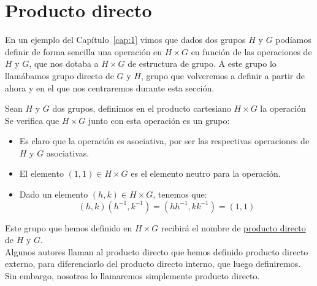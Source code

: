 \section{Producto directo}
En un ejemplo del Capítulo~\ref{cap:1} vimos que dados dos grupos $H$ y $G$ podíamos definir de forma sencilla una operación en $H\times G$ en función de las operaciones de $H$ y $G$, que nos dotaba a $H\times G$ de estructura de grupo. A este grupo lo llamábamos grupo directo de $G$ y $H$, grupo que volveremos a definir a partir de ahora y en el que nos centraremos durante esta sección.

\begin{definicion}
    Sean $H$ y $G$ dos grupos, definimos en el producto cartesiano $H\times G$ la operación
    Se verifica que $H\times G$ junto con esta operación es un grupo:
    \begin{itemize}
        \item Es claro que la operación es asociativa, por ser las respectivas operaciones de $H$ y $G$ asociativas.
        \item El elemento $(1,1)\in H\times G$ es el elemento neutro para la operación.
        \item Dado un elemento $(h,k)\in H\times G$, tenemos que:
            \begin{equation*}
                (h,k)(h^{-1},k^{-1}) = (hh^{-1},kk^{-1}) = (1, 1)
            \end{equation*}
    \end{itemize}
    Este grupo que hemos definido en $H\times G$ recibirá el nombre de \underline{producto directo} de $H$ y $G$.\\

    Algunos autores llaman al producto directo que hemos definido producto directo externo, para diferenciarlo del producto directo interno, que luego definiremos. Sin embargo, nosotros lo llamaremos simplemente producto directo.
\end{definicion}

